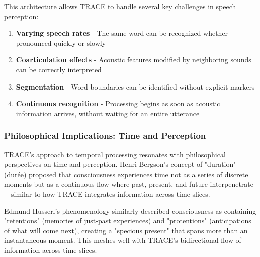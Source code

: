 \documentclass[12pt,a4paper]{article}
\begin{document}
This architecture allows TRACE to handle several key challenges in speech perception:

\begin{enumerate}
\item \textbf{Varying speech rates} - The same word can be recognized whether pronounced quickly or slowly
\item \textbf{Coarticulation effects} - Acoustic features modified by neighboring sounds can be correctly interpreted
\item \textbf{Segmentation} - Word boundaries can be identified without explicit markers
\item \textbf{Continuous recognition} - Processing begins as soon as acoustic information arrives, without waiting for an entire utterance
\end{enumerate}

\subsubsection{Philosophical Implications: Time and Perception}

TRACE's approach to temporal processing resonates with philosophical perspectives on time and perception. Henri Bergson's concept of "duration" (durée) proposed that consciousness experiences time not as a series of discrete moments but as a continuous flow where past, present, and future interpenetrate—similar to how TRACE integrates information across time slices.

Edmund Husserl's phenomenology similarly described consciousness as containing "retentions" (memories of just-past experiences) and "protentions" (anticipations of what will come next), creating a "specious present" that spans more than an instantaneous moment. This meshes well with TRACE's bidirectional flow of information across time slices.

\begin{tcolorbox}[enhanced, colback=purple!5, colframe=purple!75!black, title=The Philosophy of Time in Speech Perception]
\begin{center}
\end{center}
\end{tcolorbox}
\end{document}
